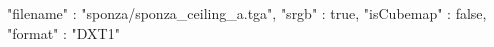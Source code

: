 { 
	"filename" : "sponza/sponza_ceiling_a.tga", 
	"srgb" : true,
	"isCubemap" : false,
	"format" : "DXT1"
}